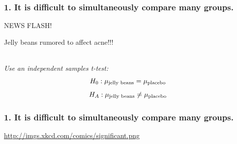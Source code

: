 \documentclass[slidestop,compress,mathserif,12pt,t,professionalfonts,xcolor=table]{beamer}
\newcommand{\soln}[1]{\textit{#1}}
\newcommand{\mainideaA}{It is difficult to simultaneously compare many groups.}
\begin{document}
\begin{frame}
  \frametitle{1. \mainideaA}

  \begin{center}
  {\Large NEWS FLASH!}

  \hspace{12pt}

  Jelly beans rumored to affect acne!!!
  \end{center}

  \pause


    \hfill \\

    \pause
   \soln{
     Use an independent samples t-test:
     \[
     H_0: \mu_{\textmd{jelly beans}} = \mu_{\textmd{placebo}}
     \]
     \[
     H_A: \mu_{\textmd{jelly beans}} \neq \mu_{\textmd{placebo}}
     \]
   }

\end{frame}


\begin{frame}
  \frametitle{1. \mainideaA}

  \vfill
  
  \begin{center}
  \url{http://imgs.xkcd.com/comics/significant.png}
  \end{center}

\end{frame}

\end{document}
